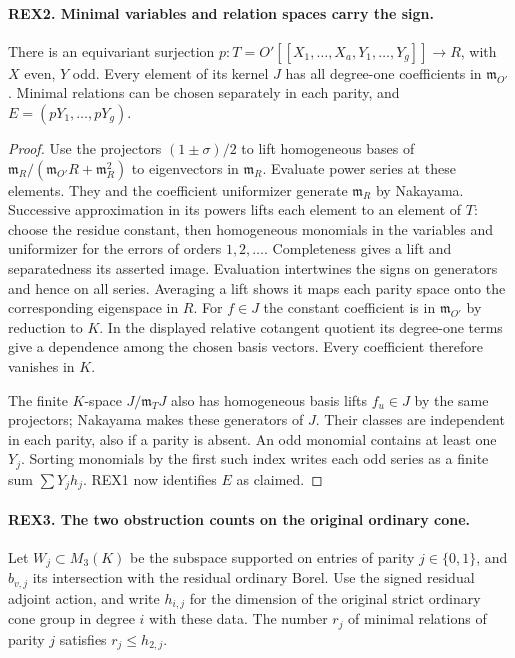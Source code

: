 \paragraph{REX2. Minimal variables and relation spaces carry the sign.}
\label{claim:REX2}
There is an equivariant surjection \(p:T=O'[[X_1,\ldots,X_a,
Y_1,\ldots,Y_g]]\to R\), with \(X\) even, \(Y\) odd. Every element
of its kernel \(J\) has all degree-one coefficients in \(\mathfrak m_{O'}\).
Minimal relations can be chosen separately in each parity, and
\(E=(pY_1,\ldots,pY_g)\).

\begin{proof}
Use the projectors \((1\pm\sigma)/2\) to lift homogeneous bases of
\(\mathfrak m_R/(\mathfrak m_{O'}R+\mathfrak m_R^2)\) to eigenvectors
in \(\mathfrak m_R\). Evaluate power series at these elements.
They and the coefficient uniformizer generate \(\mathfrak m_R\) by
Nakayama. Successive approximation in its powers lifts each element
to an element of \(T\): choose the residue constant, then homogeneous
monomials in the variables and uniformizer for the errors of orders
\(1,2,\ldots\). Completeness gives a lift and separatedness its asserted
image. Evaluation intertwines the signs on generators and hence on all
series. Averaging a lift shows it maps each parity space onto the
corresponding eigenspace in \(R\). For \(f\in J\) the constant
coefficient is in \(\mathfrak m_{O'}\) by reduction to \(K\).
In the displayed relative cotangent quotient its degree-one terms give
a dependence among the chosen basis vectors. Every coefficient therefore
vanishes in \(K\).

The finite \(K\)-space \(J/\mathfrak m_T J\) also has homogeneous
basis lifts \(f_u\in J\) by the same projectors; Nakayama makes these
generators of \(J\). Their classes are independent in each parity,
also if a parity is absent. An odd monomial contains at least one
\(Y_j\). Sorting monomials by the first such index writes each odd
series as a finite sum \(\sum Y_j h_j\). REX1 now identifies \(E\)
as claimed.
\end{proof}

\paragraph{REX3. The two obstruction counts on the original ordinary cone.}
\label{claim:REX3}
Let \(W_j\subset M_3(K)\) be the subspace supported on entries of
parity \(j\in\{0,1\}\), and \(b_{v,j}\) its intersection with the
residual ordinary Borel. Use the signed residual adjoint action, and
write \(h_{i,j}\) for the dimension of the original strict ordinary
cone group in degree \(i\) with these data. The number \(r_j\) of
minimal relations of parity \(j\) satisfies \(r_j\le h_{2,j}\).

